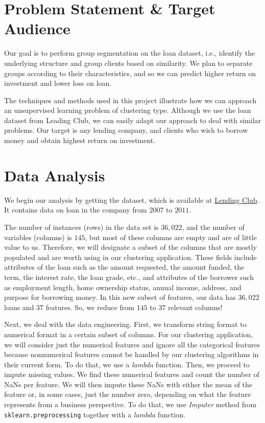 \documentclass[a4paper,11pt]{amsart}
\begin{document}
\section{Problem Statement \& Target Audience}\label{problem} 

Our goal is to perform group segmentation on the loan dataset, i.e., identify the underlying structure and group clients based on similarity. We plan to separate groups according to their characteristics, and so we can predict higher return on investment and lower loss on loan. 

\medbreak

The techniques and methods used in this project illustrate how we can approach an unsupervised learning problem of clustering type. Although we use the loan dataset from Leading Club, we can easily adapt our approach to deal with similar problems. Our target is any lending company, and clients who wish to borrow money and obtain highest return on investment.

\section{Data Analysis}\label{dataanalysis}

We begin our analysis by getting the dataset, which is available at \href{https://www.lendingclub.com/}{Lending Club}. It contains data on loan in the company from $2007$ to $2011$. 
\medbreak

The number of instances (rows) in the data set is $36,022$, and the number of variables (columns) is $145$, but most of these columns are empty and are of little value to us. Therefore, we will designate a subset of the columns that are mostly populated and are worth using in our clustering application. These fields include attributes of the loan such as the amount requested, the amount funded, the term, the interest rate, the loan grade, etc., and attributes of the borrower such as employment length, home ownership status, annual income, address, and purpose for borrowing money. In this new subset of features, our data has $36,022$ loans and $37$ features. So, we reduce from $145$ to $37$ relevant columns!

\medbreak

Next, we deal with the data engineering. First, we transform string format to numerical format in a certain subset of columns. For our clustering application, we will consider just the numerical features and ignore all the categorical features because nonnumerical features cannot be handled by our clustering algorithms in their current form. To do that, we use a \emph{lambda} function. Then, we proceed to impute missing values. We find these numerical features and count the number of NaNs per feature. We will then impute these NaNs with either the mean of the feature or, in some cases, just the number zero, depending on what the feature represents from a business perspective. To do that, we use \emph{Imputer} method from \texttt{sklearn.preprocessing} together with a \emph{lambda} function. 
\end{document}
